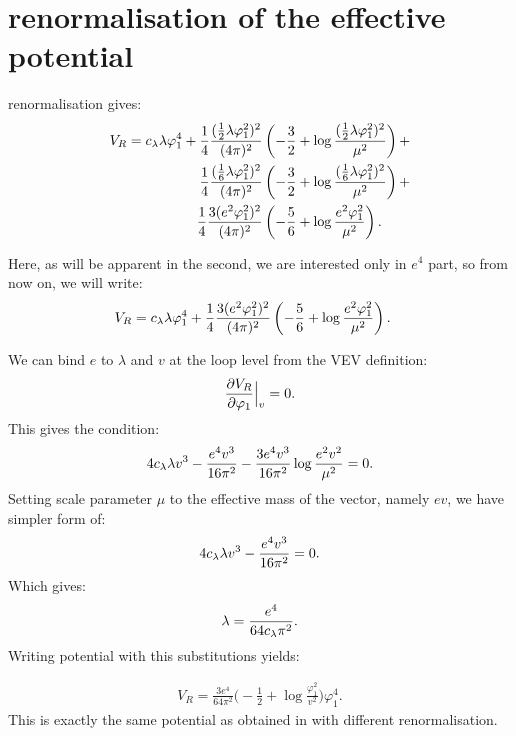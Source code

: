 \chapter{\texorpdfstring{\MSbar}{MS-bar} renormalisation of the effective potential}



\MSbar renormalisation gives:
\begin{align}
V_{R}=c_\lambda\lambda\varphi_1^4 + \frac{1}{4}\frac{(\frac{1}{2}\lambda\varphi_1^2)^2}{(4\pi)^2}&\left(-\frac{3}{2}+ 
\log{\frac{(\frac{1}{2}\lambda\varphi_1^2)^2}{\mu^2}}\right) + \\
\frac{1}{4}\frac{(\frac{1}{6}\lambda\varphi_1^2)^2}{(4\pi)^2}&\left(-\frac{3}{2}+ 
\log{\frac{(\frac{1}{6}\lambda\varphi_1^2)^2}{\mu^2}}\right) + \\
\frac{1}{4}\frac{3(e^2\varphi_1^2)^2}{(4\pi)^2}&\left(-\frac{5}{6}+
\log{\frac{e^2\varphi_1^2}{\mu^2}}\right).
\end{align}

Here, as will be apparent in the second, we are interested only in $e^4$ part, so from now on, 
we will write:
\begin{align}
V_{R}=c_\lambda\lambda\varphi_1^4 + \frac{1}{4}\frac{3(e^2\varphi_1^2)^2}{(4\pi)^2}&\left(-\frac{5}{6}+
\log{\frac{e^2\varphi_1^2}{\mu^2}}\right).
\end{align}

We can bind $e$ to $\lambda$ and $v$ at the loop level from the VEV definition:
\begin{align}
\frac{\partial V_R}{\partial \varphi_1} \Big|_v= 0.
\end{align}
This gives the condition:
\begin{align}
4c_\lambda\lambda v^3-\frac{e^4v^3}{16\pi^2}-\frac{3e^4v^3}{16\pi^2}\log\frac{e^2v^2}{\mu^2}=0.
\end{align}
Setting scale parameter $\mu$ to the effective mass of the vector, namely $ev$, we have 
simpler form of:
\begin{align}
4c_\lambda\lambda v^3-\frac{e^4v^3}{16\pi^2}=0.
\end{align}
Which gives:
\begin{align}\label{e4_lambda_MS}
\lambda = \frac{e^4}{64c_\lambda\pi^2}.
\end{align}
Writing potential with this substitutions yields:

\begin{align}\label{MSbar_result}
V_R = \frac{3e^4}{64\pi^2}\Big(-\frac{1}{2}+\log\frac{\varphi_1^2}{v^2}\Big)\varphi_1^4.
\end{align}
This is exactly the same potential as obtained in \cite{Coleman1973} with different renormalisation.

